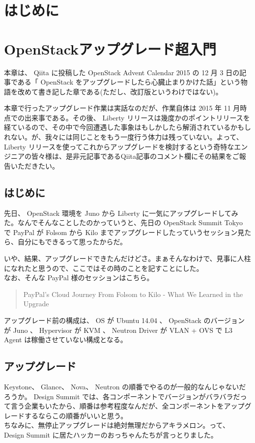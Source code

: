 \documentclass[9pt,b5paper,tombo,openany]{jsbook}
\begin{document}
\tableofcontents

\chapter{はじめに}

\chapter{OpenStackアップグレード超入門}
本章は、 Qiita に投稿した OpenStack Advent Calendar 2015 の 12 月 3 日の記事である「 OpenStack をアップグレードしたら心臓止まりかけた話」という物語を改めて書き記した章である(ただし、改訂版というわけではない)。

本章で行ったアップグレード作業は実話なのだが、作業自体は 2015 年 11 月時点での出来事である。その後、 Liberty リリースは幾度かのポイントリリースを経ているので、その中で今回遭遇した事象はもしかしたら解消されているかもしれない。が、我々には同じことをもう一度行う体力は残っていない。よって、 Liberty リリースを使ってこれからアップグレードを検討するという奇特なエンジニアの皆々様は、是非元記事であるQiita記事のコメント欄にその結果をご報告いただきたい。

\section{はじめに}
先日、 OpenStack 環境を Juno から Liberty に一気にアップグレードしてみた。なんでそんなことしたのかっていうと、先日の OpenStack Summit Tokyo で PayPal が Folsom から Kilo までアップグレードしたっていうセッション見たら、自分にもできるって思ったからだ。

いや、結果、アップグレードできたんだけどさ。まぁそんなわけで、見事に人柱になれたと思うので、ここではその時のことを記すことにした。\\[1ex]

\noindent
なお、そんな PayPal 様のセッションはこちら。

\begin{quote}
	PayPal's Cloud Journey From Folsom to Kilo - What We Learned in the Upgrade
\end{quote}

アップグレード前の構成は、 OS が Ubuntu 14.04 、 OpenStack のバージョンが Juno 、 Hypervisor が KVM 、 Neutron Driver が VLAN + OVS で L3 Agent は稼働させていない構成となる。

\section{アップグレード}
Keystone、 Glance、 Nova、 Neutron の順番でやるのが一般的なんじゃないだろうか。 Design Summit では、各コンポーネントでバージョンがバラバラだって言う企業もいたから、順番は参考程度なんだが、全コンポーネントをアップグレードするならこの順番がいいと思う。\\[1ex]
ちなみに、無停止アップグレードは絶対無理だからアキラメロン。って、 Design Summit に居たハッカーのおっちゃんたちが言っとりました。\\[1ex]
\end{document}
